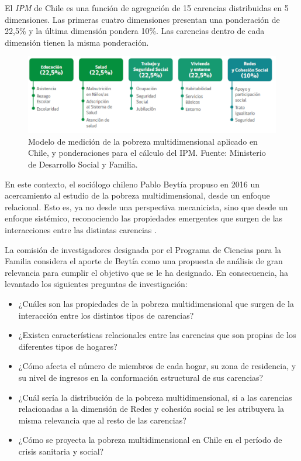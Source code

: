 \documentclass[12pt,letterpaper,spanish]{article}
\begin{document}
El \textit{IPM} de Chile es una función de agregación de 15 carencias distribuidas en 5 dimensiones. Las primeras cuatro dimensiones presentan una ponderación de 22,5\% y la última dimensión pondera 10\%. Las carencias dentro de cada dimensión tienen la misma ponderación. 





\begin{figure}[H]
    \centering
    \includegraphics[width=14cm]{Max/multi5d.png}
    \caption{Modelo de medición de la pobreza multidimensional aplicado en Chile, y ponderaciones para el cálculo del IPM. Fuente: Ministerio de Desarrollo Social y Familia.}
    \label{modelo5d}
\end{figure}



En este contexto, el sociólogo chileno Pablo Beytía propuso en 2016 un acercamiento al estudio de la pobreza multidimensional, desde un enfoque relacional. Esto es, ya no desde una perspectiva mecanicista, sino que desde un enfoque sistémico, reconociendo las propiedades emergentes que surgen de las interacciones entre las distintas carencias \cite{Beytia2016LaMultidimensional}.

La comisión de investigadores designada por el Programa de Ciencias para la Familia considera el aporte de Beytía como una propuesta de análisis de gran relevancia para cumplir el objetivo que se le ha designado. En consecuencia, ha levantado los siguientes preguntas de investigación:

\begin{itemize}

    \item ¿Cuáles son las propiedades de la pobreza multidimensional que surgen de la interacción entre los distintos tipos de carencias?

    \item ¿Existen características relacionales entre las carencias que son propias de los diferentes tipos de hogares?

    \item ¿Cómo afecta el número de miembros de cada hogar, su zona de residencia, y su nivel de ingresos en la conformación estructural de sus carencias?

    \item ¿Cuál sería la distribución de la pobreza multidimensional, si a las carencias relacionadas a la dimensión de Redes y cohesión social se les atribuyera la misma relevancia que al resto de las carencias?

    \item ¿Cómo se proyecta la pobreza multidimensional en Chile en el período de crisis sanitaria y social?

\end{itemize}
\end{document}
